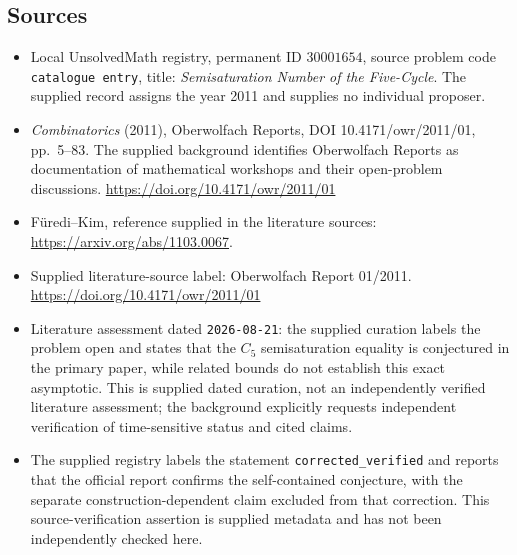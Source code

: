 \documentclass[11pt]{article}
\begin{document}
\subsection{Sources}
\begin{itemize}
\item Local UnsolvedMath registry, permanent ID \(30001654\), source problem code \texttt{catalogue entry}, title: \emph{Semisaturation Number of the Five-Cycle}. The supplied record assigns the year 2011 and supplies no individual proposer.
\item \emph{Combinatorics} (2011), Oberwolfach Reports, DOI 10.4171/owr/2011/01, pp.\ 5--83. The supplied background identifies Oberwolfach Reports as documentation of mathematical workshops and their open-problem discussions. \url{https://doi.org/10.4171/owr/2011/01}
\item F\"uredi--Kim, reference supplied in the literature sources: \url{https://arxiv.org/abs/1103.0067}.
\item Supplied literature-source label: Oberwolfach Report 01/2011. \url{https://doi.org/10.4171/owr/2011/01}
\item Literature assessment dated \texttt{2026-08-21}: the supplied curation labels the problem open and states that the \(C_5\) semisaturation equality is conjectured in the primary paper, while related bounds do not establish this exact asymptotic. This is supplied dated curation, not an independently verified literature assessment; the background explicitly requests independent verification of time-sensitive status and cited claims.
\item The supplied registry labels the statement \texttt{corrected\_verified} and reports that the official report confirms the self-contained conjecture, with the separate construction-dependent claim excluded from that correction. This source-verification assertion is supplied metadata and has not been independently checked here.
\end{itemize}
\end{document}
